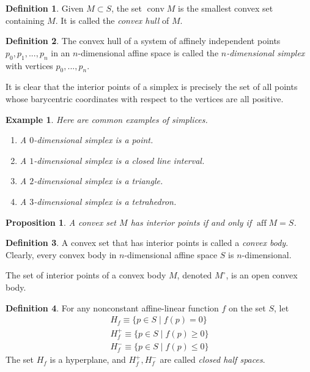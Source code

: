 \documentclass{article}
\DeclareMathOperator{\conv}{conv}
\DeclareMathOperator{\aff}{aff}
\newtheorem{proposition}[theorem]{Proposition}
\newtheorem{example}{Example}[section]
\theoremstyle{remark}
\theoremstyle{definition}
\newtheorem{definition}{Definition}[section]
\begin{document}
\begin{definition}
Given $M \subset S$, the set $\conv M$ is the smallest convex set containing $M$. It is called the \textit{convex hull} of $M$. 
\end{definition}

\begin{definition}
The convex hull of a system of affinely independent points $p_0, p_1, ..., p_n$ in an $n$-dimensional affine space is called the \textit{$n$-dimensional simplex} with vertices $p_0, ..., p_n$. 
\end{definition}

It is clear that the interior points of a simplex is precisely the set of all points whose barycentric coordinates with respect to the vertices are all positive. 

\begin{example}
Here are common examples of simplices.
\begin{enumerate}
    \item A $0$-dimensional simplex is a point. 
    \item A $1$-dimensional simplex is a closed line interval. 
    \item A $2$-dimensional simplex is a triangle. 
    \item A $3$-dimensional simplex is a tetrahedron. 
\end{enumerate}
\end{example}

\begin{proposition}
A convex set $M$ has interior points if and only if $\aff M = S$. 
\end{proposition}

\begin{definition}
A convex set that has interior points is called a \textit{convex body}. Clearly, every convex body in $n$-dimensional affine space $S$ is $n$-dimensional. 
\end{definition}

The set of interior points of a convex body $M$, denoted $M^\circ$, is an open convex body. 

\begin{definition}
For any nonconstant affine-linear function $f$ on the set $S$, let
\begin{align*}
    H_f \equiv \{p \in S \;|\; f(p) = 0\} \\
    H^+_f \equiv \{p \in S \;|\; f(p) \geq 0\} \\
    H^-_f \equiv \{p \in S \;|\; f(p) \leq 0\}
\end{align*}
The set $H_f$ is a hyperplane, and $H^+_f, H^-_f$ are called \textit{closed half spaces}. 
\end{definition}
\end{document}
